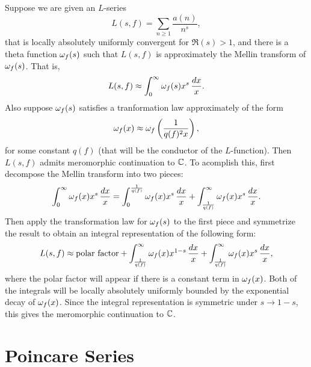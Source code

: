 \documentclass[12pt,oneside]{book}
\begin{document}
        \begin{method}
        Suppose we are given an $L$-series
        \[
            L(s,f) = \sum_{n \ge 1}\frac{a(n)}{n^{s}},
        \]
        that is locally absolutely uniformly convergent for $\Re(s) > 1$, and there is a theta function $\omega_{f}(s)$ such that $L(s,f)$ is approximately the Mellin transform of $\omega_{f}(s)$. That is, 
        \[
            L(s,f) \approx \int_{0}^{\infty}\omega_{f}(s)x^{s}\,\frac{dx}{x}.
        \]
        Also suppose $\omega_{f}(s)$ satisfies a tranformation law approximately of the form
        \[
            \omega_{f}(x) \approx \omega_{f}\left(\frac{1}{q(f)^{2}x}\right),
        \]
        for some constant $q(f)$ (that will be the conductor of the $L$-function). Then $L(s,f)$ admits meromorphic continuation to $\mathbb{C}$. To acomplish this, first decompose the Mellin transform into two pieces:
        \[
            \int_{0}^{\infty}\omega_{f}(x)x^{s}\,\frac{dx}{x} = \int_{0}^{\frac{1}{q(f)}}\omega_{f}(x)x^{s}\,\frac{dx}{x}+\int_{\frac{1}{q(f)}}^{\infty}\omega_{f}(x)x^{s}\,\frac{dx}{x}.
        \]
        Then apply the transformation law for $\omega_{f}(s)$ to the first piece and symmetrize the result to obtain an integral representation of the following form:
        \[
            L(s,f) \approx \text{polar factor}+\int_{\frac{1}{q(f)}}^{\infty}\omega_{f}(x)x^{1-s}\,\frac{dx}{x}+\int_{\frac{1}{q(f)}}^{\infty}\omega_{f}(x)x^{s}\,\frac{dx}{x},
        \]
        where the polar factor will appear if there is a constant term in $\omega_{f}(x)$. Both of the integrals will be locally absolutely uniformly bounded by the exponential decay of $\omega_{f}(x)$. Since the integral representation is symmetric under $s \to 1-s$, this gives the meromorphic continuation to $\mathbb{C}$.
        \end{method}
    \section{Poincare Series}
\end{document}
